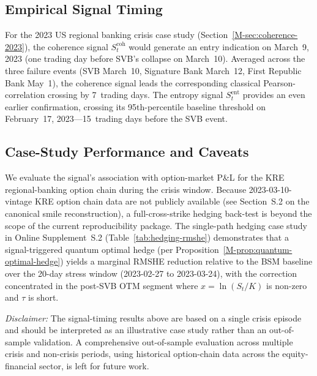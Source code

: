 \subsection{Empirical Signal Timing}

For the 2023 US regional banking crisis case study
(Section~\ref{M-sec:coherence-2023}), the coherence signal $S_t^{\mathrm{coh}}$
would generate an entry indication on March~9, 2023 (one trading day before SVB's
collapse on March~10). Averaged across the three failure events
(SVB March~10, Signature Bank March~12, First Republic Bank May~1), the
coherence signal leads the corresponding classical Pearson-correlation crossing
by 7~trading days. The entropy signal $S_t^{\mathrm{ent}}$ provides an even
earlier confirmation, crossing its 95th-percentile baseline threshold on
February~17, 2023---15~trading days before the SVB event.

\subsection{Case-Study Performance and Caveats}

We evaluate the signal's association with option-market P\&L for the KRE
regional-banking option chain during the crisis window. Because
2023-03-10-vintage KRE option chain data are not publicly available (see
Section~S.2 on the canonical smile reconstruction), a
full-cross-strike hedging back-test is beyond the scope of the current
reproducibility package. The single-path hedging case study in
Online Supplement~S.2 (Table~\ref{tab:hedging-rmshe}) demonstrates that a signal-triggered quantum
optimal hedge (per Proposition~\ref{M-prop:quantum-optimal-hedge}) yields a
marginal RMSHE reduction relative to the BSM baseline over the 20-day stress
window (2023-02-27 to 2023-03-24), with the correction concentrated in the
post-SVB OTM segment where $x = \ln(S_t/K)$ is non-zero and $\tau$ is short.

\emph{Disclaimer:} The signal-timing results above are based on a single
crisis episode and should be interpreted as an illustrative case study rather
than an out-of-sample validation. A comprehensive out-of-sample evaluation
across multiple crisis and non-crisis periods, using historical option-chain
data across the equity-financial sector, is left for future work.
